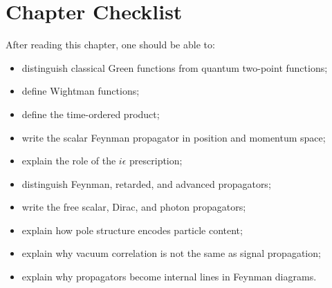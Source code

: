\section{Chapter Checklist}

After reading this chapter, one should be able to:
\begin{itemize}
    \item distinguish classical Green functions from quantum two-point functions;
    \item define Wightman functions;
    \item define the time-ordered product;
    \item write the scalar Feynman propagator in position and momentum space;
    \item explain the role of the \(i\epsilon\) prescription;
    \item distinguish Feynman, retarded, and advanced propagators;
    \item write the free scalar, Dirac, and photon propagators;
    \item explain how pole structure encodes particle content;
    \item explain why vacuum correlation is not the same as signal propagation;
    \item explain why propagators become internal lines in Feynman diagrams.
\end{itemize}
